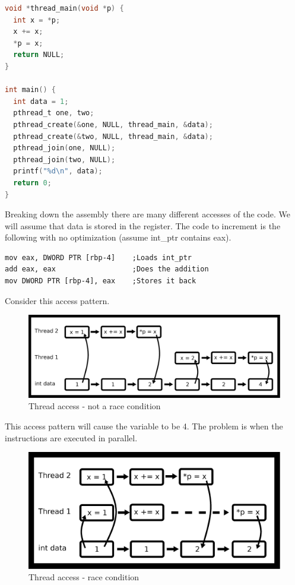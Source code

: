 \begin{lstlisting}[language=C]
void *thread_main(void *p) {
  int x = *p;
  x += x;
  *p = x;
  return NULL;
}

int main() {
  int data = 1;
  pthread_t one, two;
  pthread_create(&one, NULL, thread_main, &data);
  pthread_create(&two, NULL, thread_main, &data);
  pthread_join(one, NULL);
  pthread_join(two, NULL);
  printf("%d\n", data);
  return 0;
}
\end{lstlisting}

Breaking down the assembly there are many different accesses of the code.
We will assume that data is stored in the  register.
The code to increment is the following with no optimization (assume int\_ptr contains eax).

\begin{lstlisting}[language={[x86masm]Assembler}]
mov eax, DWORD PTR [rbp-4]    ;Loads int_ptr
add eax, eax                  ;Does the addition
mov DWORD PTR [rbp-4], eax    ;Stores it back
\end{lstlisting}

Consider this access pattern.

\begin{figure}[H]
\centering
\includegraphics[width=.7\textwidth]{threads/drawings/thread_nonrace_timing.eps}
\caption{Thread access - not a race condition}
\end{figure}

This access pattern will cause the variable  to be 4.
The problem is when the instructions are executed in parallel.

\begin{figure}[H]
\centering
\includegraphics[width=.5\textwidth]{threads/drawings/thread_race_timing.eps}
\caption{Thread access - race condition}
\end{figure}

